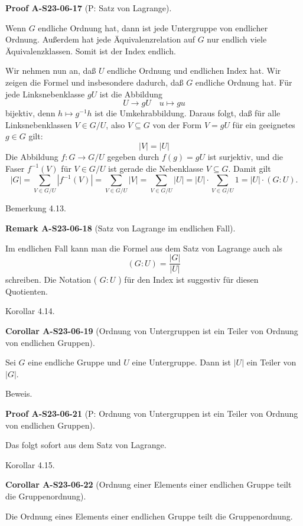 \documentclass[10pt, letterpaper]{article}
\newcommand{\CustomHeading}[3]{%
  \par\medskip\noindent%
  \textbf{#1 #2} \textnormal{(#3)}.\enskip%
}
\newenvironment{KORO}[2]{\begin{unitbox}\CustomHeading{Corollar}{#1}{#2}}{\end{unitbox}}
\newenvironment{REM}[2]{\begin{unitbox}\CustomHeading{Remark}{#1}{#2}}{\end{unitbox}}
\newenvironment{PROOF}[2]{\begin{unitbox}\CustomHeading{Proof}{#1}{#2}}{\end{unitbox}}
\begin{document}
\begin{PROOF}{A-S23-06-17}{P: Satz von Lagrange}
Wenn $G$ endliche Ordnung hat, dann ist jede Untergruppe von endlicher Ordnung. Außerdem hat jede Äquivalenzrelation auf $G$ nur endlich viele Äquivalenzklassen. Somit ist der Index endlich.

Wir nehmen nun an, daß $U$ endliche Ordnung und endlichen Index hat. Wir zeigen die Formel und insbesondere dadurch, daß $G$ endliche Ordnung hat. Für jede Linksnebenklasse $g U$ ist die Abbildung
$$
U \rightarrow g U \quad u \mapsto g u
$$
bijektiv, denn $h \mapsto g^{-1} h$ ist die Umkehrabbildung. Daraus folgt, daß für alle Linksnebenklassen $V \in G / U$, also $V \subseteq G$ von der Form $V=g U$ für ein geeignetes $g \in G$ gilt:
$$
|V|=|U|
$$
Die Abbildung $f: G \rightarrow G / U$ gegeben durch $f(g)=g U$ ist surjektiv, und die Faser $f^{-1}(V)$ für $V \in G / U$ ist gerade die Nebenklasse $V \subseteq G$. Damit gilt
$$
|G|=\sum_{V \in G / U}\left|f^{-1}(V)\right|=\sum_{V \in G / U}|V|=\sum_{V \in G / U}|U|=|U| \cdot \sum_{V \in G / U} 1=|U| \cdot(G: U) .
$$
\end{PROOF}



Bemerkung 4.13. 


\begin{REM}{A-S23-06-18}{Satz von Lagrange im endlichen Fall}
Im endlichen Fall kann man die Formel aus dem Satz von Lagrange auch als
$$
(G: U)=\frac{|G|}{|U|}
$$
schreiben. Die Notation ( $G: U$ ) für den Index ist suggestiv für diesen Quotienten.
\end{REM}



Korollar 4.14. 

\begin{KORO}{A-S23-06-19}{Ordnung von Untergruppen ist ein Teiler von Ordnung von endlichen Gruppen}
Sei $G$ eine endliche Gruppe und $U$ eine Untergruppe. Dann ist $|U|$ ein Teiler von $|G|$.
\end{KORO}


Beweis. 

\begin{PROOF}{A-S23-06-21}{P: Ordnung von Untergruppen ist ein Teiler von Ordnung von endlichen Gruppen}
Das folgt sofort aus dem Satz von Lagrange.
\end{PROOF}



Korollar 4.15. 


\begin{KORO}{A-S23-06-22}{Ordnung einer Elements einer endlichen Gruppe teilt die Gruppenordnung}
Die Ordnung eines Elements einer endlichen Gruppe teilt die Gruppenordnung.
\end{KORO}
\end{document}

